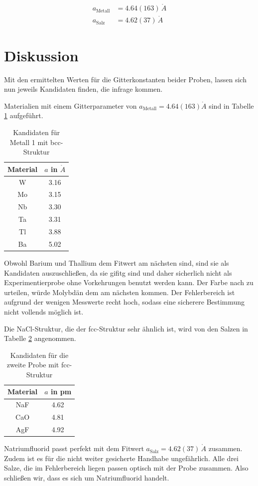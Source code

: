 \begin{align}
 a_\text{Metall} &= 4.64(163)\, \mathring{A} \\
 \nonumber
 a_\text{Salz} &= 4.62(37)\, \mathring{A} 
 \label{eq:latticeResults}
\end{align}

\noindent
\section{Diskussion}
Mit den ermittelten Werten für die Gitterkonstanten beider Proben, lassen sich nun jeweils Kandidaten finden, die infrage kommen.

\noindent Materialien mit einem Gitterparameter von $a_\text{Metall} = 4.64(163) \mathring{A}$ sind in Tabelle \ref{tab:matProb1} 
aufgeführt.

\begin{table}[H]
 \begin{tabular}{cc}
Material &$a$ in $\mathring{A}$\\
\hline
W&3.16\\ 
Mo& 3.15\\ 
Nb & 3.30\\ 
Ta & 3.31\\ 
Tl & 3.88\\ 
Ba & 5.02\\ 
  
 \end{tabular}
 \caption{Kandidaten für Metall 1 mit bcc-Struktur \cite{Gitterparameter}}
 \label{tab:matProb1}

\end{table}
\noindent Obwohl Barium und Thallium dem Fitwert am nächsten sind, sind sie als Kandidaten auszuschließen, da sie gifitg sind und daher sicherlich nicht
als Experimentierprobe ohne Vorkehrungen benutzt werden kann. Der Farbe nach zu urteilen, würde Molybdän dem am nächsten kommen. Der Fehlerbereich ist
aufgrund der wenigen Messwerte recht hoch, sodass eine sicherere Bestimmung nicht vollends möglich ist.

\noindent
Die NaCl-Struktur, die der fcc-Struktur sehr ähnlich ist, wird von den Salzen in Tabelle \ref{tab:matProb2} angenommen.

\begin{table}[H]
 \begin{tabular}{cc}
Material &$a$ in pm\\
\hline
NaF& 4.62\\
CaO & 4.81\\
AgF & 4.92\\
  
 \end{tabular}
 \caption{Kandidaten für die zweite Probe mit fcc-Struktur \cite{Gitterparameter}}
 \label{tab:matProb2}

\end{table}
\noindent Natriumfluorid passt perfekt mit dem Fitwert  $a_\text{Salz} = 4.62(37)\, \mathring{A} $ zusammen. Zudem ist es für die nicht weiter gesicherte
Handhabe ungefährlich. Alle drei Salze, die im Fehlerbereich liegen passen optisch mit der Probe zusammen. Also schließen wir, dass es sich um Natriumfluorid
handelt.


